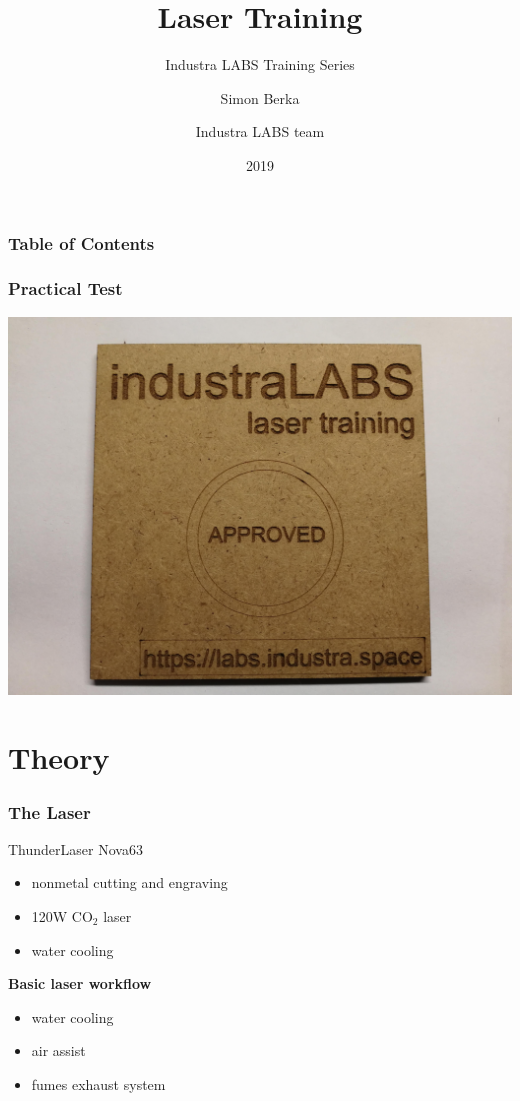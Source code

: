 \documentclass[14pt]{beamer}
\title[Laser Training] %
{Laser Training}
\subtitle{Industra LABS Training Series}
\author[Simon Berka] %
{Simon Berka\inst{1} \and Industra LABS team\inst{2}}
\date[2019] %
{2019}
\begin{document}
\frame{\titlepage}


\begin{frame}
\frametitle{Table of Contents}
\tableofcontents
\end{frame}

\begin{frame}
\frametitle{Practical Test}
\centering
\includegraphics[scale=0.06]{imgs/approved.jpg}
\end{frame}

\section{Theory}

\begin{frame}
\frametitle{The Laser}

\begin{block}{ThunderLaser Nova63}
\begin{itemize}
\item nonmetal cutting and engraving
\item 120W CO$_{2}$ laser
\item water cooling
\end{itemize}
\end{block}

\textbf{Basic laser workflow}
\begin{itemize}
	\item water cooling
	\item air assist
	\item fumes exhaust system
	
\end{itemize}
\end{frame}
\end{document}
